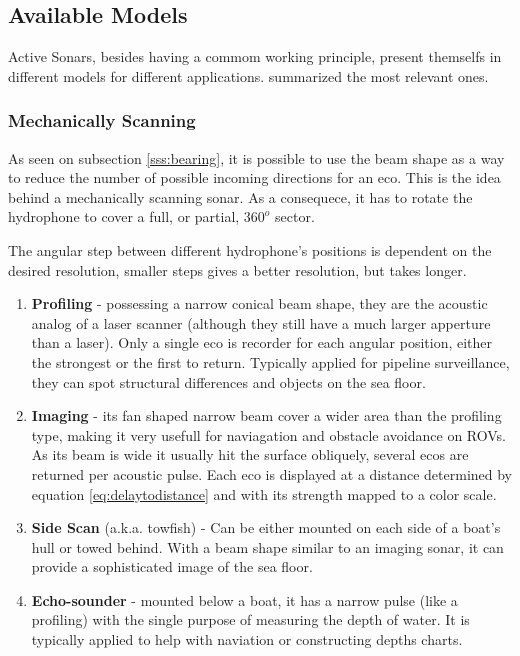\subsection{Available Models}
\label{ss:avaible_models}
 
Active Sonars, besides having a commom working principle, present themselfs in
different models for different applications. \citet{sonars:16} summarized the
most relevant ones.

\subsubsection{Mechanically Scanning}

As seen on subsection \ref{sss:bearing}, it is possible to use the beam shape as
a way to reduce the number of possible incoming directions for an eco. This is
the idea behind a mechanically scanning sonar. As a consequece, it has to rotate
the hydrophone to cover a full, or partial, $360^o$ sector.

The angular step between different hydrophone's positions is dependent on the
desired resolution, smaller steps gives a better resolution, but takes longer.

\begin{enumerate}
  \item \textbf{Profiling} - possessing a narrow conical beam shape, they are the
  acoustic analog of a laser scanner (although they still have a much larger
  apperture than a laser). Only a single eco is recorder for each angular
  position, either the strongest or the first to return. Typically applied for
  pipeline surveillance, they can spot structural differences and objects on the
  sea floor.
  \item \textbf{Imaging} - its fan shaped narrow beam cover a wider area than
  the profiling type, making it very usefull for naviagation and obstacle
  avoidance on ROVs. As its beam is wide it usually hit the surface obliquely,
  several ecos are returned per acoustic pulse. Each eco is displayed at a
  distance determined by equation \ref{eq:delaytodistance} and with its strength
  mapped to a color scale.
  \item \textbf{Side Scan} (a.k.a. towfish) - Can be either mounted on each side
  of a boat's hull or towed behind. With a beam shape similar to an imaging
  sonar, it can provide a sophisticated image of the sea floor.
  \item \textbf{Echo-sounder} - mounted below a boat, it has a narrow pulse
  (like a profiling) with the single purpose of measuring the depth of water. It
  is typically applied to help with naviation or constructing depths charts.
\end{enumerate}

